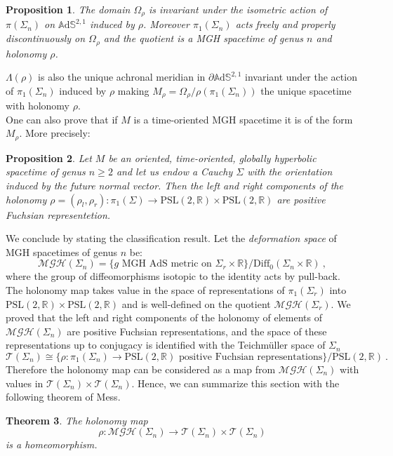 \documentclass[10pt,a4paper,oneside,reqno]{book}
\def\R{\mathbb{R}}
\def\A{\mathbb{A}\mathrm{d}\mathbb{S}}
\def\PSL{\text{PSL}(2,\R)}
\theoremstyle{plain}
\newtheorem{theorem}{Theorem}[chapter] %
\theoremstyle{definition}
\theoremstyle{plain}
\newtheorem{proposition}[theorem]{Proposition}
\theoremstyle{plain}
\theoremstyle{mystyleNormalFont}
\begin{document}
\begin{proposition}
    The domain $\Omega_\rho$ is invariant under the isometric action of $\pi(\Sigma_n)$ on $\A^{2,1}$ induced by $\rho$. Moreover $\pi_1(\Sigma_n)$ acts freely and properly discontinuously on $\Omega_\rho$ and the quotient is a MGH spacetime of genus $n$ and holonomy $\rho$.
\end{proposition}
$\Lambda(\rho)$ is also the unique achronal meridian in $\partial\A^{2,1}$ invariant under the action of $\pi_1(\Sigma_n)$ induced by $\rho$ making $M_\rho = \Omega_\rho / \rho(\pi_1(\Sigma_n))$ the unique spacetime with holonomy $\rho$.\\
One can also prove that if $M$ is a time-oriented MGH spacetime it is of the form $M_\rho$. More precisely:
\begin{proposition}
    Let $M$ be an oriented, time-oriented, globally hyperbolic spacetime of genus $n\geq 2$ and let us endow a Cauchy $\Sigma$ with the orientation induced by the future normal vector. Then the left and right components of the holonomy $\rho=(\rho_l,\rho_r): \pi_1(\Sigma)\to\PSL\times\PSL$ are positive Fuchsian representetion.
\end{proposition}


We conclude by stating the classification result. Let the \emph{deformation space} of MGH spacetimes of genus $n$ be:
$$\mathcal{MGH}(\Sigma_n)=\{g\text{ MGH AdS metric on }\Sigma_r\times\R\}/\mathrm{Diff}_0(\Sigma_n\times\R)~,$$
where the group of diffeomorphisms isotopic to the identity acts by pull-back. The holonomy map takes value in the space of representations of $\pi_1(\Sigma_r)$ into $\PSL\times\PSL$ and is well-defined on the quotient $\mathcal{MGH}(\Sigma_r)$.
We proved that the left and right components of the holonomy of elements of $\mathcal{MGH}(\Sigma_n)$ are positive Fuchsian representations, and the space of these representations up to conjugacy is identified with the Teichm\"uller space of $\Sigma_n$
\[
    \mathcal{T}(\Sigma_n)\cong\{\rho:\pi_1(\Sigma_n)\to\PSL\text{ positive Fuchsian representations}\}/\PSL~.
\]
Therefore the holonomy map can be considered as a map 
from $\mathcal{MGH}(\Sigma_n)$ with values in $\mathcal{T}(\Sigma_n)\times\mathcal{T}(\Sigma_n)$.
Hence, we can summarize this section with the following theorem of Mess.

\begin{theorem} \label{thm:classification rgeq2}
The holonomy map $$\rho:\mathcal{MGH}(\Sigma_n)\to\mathcal{T}(\Sigma_n)\times\mathcal{T}(\Sigma_n)$$ is a homeomorphism.
\end{theorem}
\end{document}
